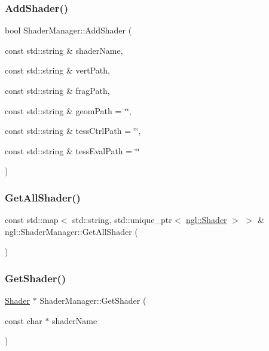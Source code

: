 \subsubsection{\texorpdfstring{Add\+Shader()}{AddShader()}}
{\footnotesize\ttfamily bool Shader\+Manager\+::\+Add\+Shader (\begin{DoxyParamCaption}\item[{const std\+::string \&}]{shader\+Name,  }\item[{const std\+::string \&}]{vert\+Path,  }\item[{const std\+::string \&}]{frag\+Path,  }\item[{const std\+::string \&}]{geom\+Path = {\ttfamily \char`\"{}\char`\"{}},  }\item[{const std\+::string \&}]{tess\+Ctrl\+Path = {\ttfamily \char`\"{}\char`\"{}},  }\item[{const std\+::string \&}]{tess\+Eval\+Path = {\ttfamily \char`\"{}\char`\"{}} }\end{DoxyParamCaption})}

\mbox{\label{classngl_1_1_shader_manager_a27db6fcf60854158dc8e8ab6bab98999}} 
\subsubsection{\texorpdfstring{Get\+All\+Shader()}{GetAllShader()}}
{\footnotesize\ttfamily const std\+::map$<$ std\+::string, std\+::unique\+\_\+ptr$<$ \mbox{\hyperlink{classngl_1_1_shader}{ngl\+::\+Shader}} $>$ $>$ \& ngl\+::\+Shader\+Manager\+::\+Get\+All\+Shader (\begin{DoxyParamCaption}{ }\end{DoxyParamCaption})}

\mbox{\label{classngl_1_1_shader_manager_a49683cb281bbc3e3fa86cccc6ba081ed}} 
\subsubsection{\texorpdfstring{Get\+Shader()}{GetShader()}}
{\footnotesize\ttfamily \mbox{\hyperlink{classngl_1_1_shader}{Shader}} $\ast$ Shader\+Manager\+::\+Get\+Shader (\begin{DoxyParamCaption}\item[{const char $\ast$}]{shader\+Name }\end{DoxyParamCaption})}

